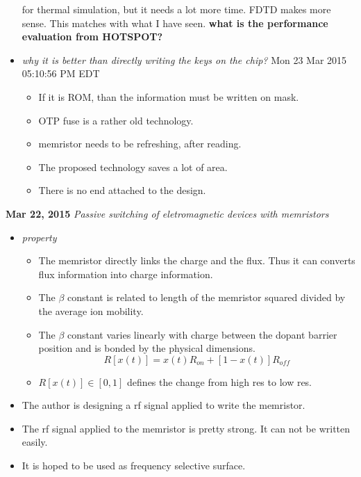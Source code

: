 \documentclass[]{article}
\newcommand{\todo}[1]{{\color{red}\textbf{#1}}}
\newcommand{\solved}[1]{{\color{blue}\textit{#1}}}
\begin{document}
\begin{itemize}
                for thermal simulation, but it needs a lot more time. FDTD makes
                more sense. This matches with what I have seen. \todo{what is
                the performance evaluation from HOTSPOT?}
                \item \solved{why it is better than directly writing the keys on
                the chip?} Mon 23 Mar 2015 05:10:56 PM EDT 
                \begin{itemize}
                    \item If it is ROM, than the information must be written on
                    mask.
                    \item OTP fuse is a rather old technology.
                    \item memristor needs to be refreshing, after reading.
                    \item The proposed technology saves a lot of area.
                    \item There is no end attached to the design.
                \end{itemize}

                
        \end{itemize}

\noindent \textbf{Mar 22, 2015}
\textit{Passive switching of eletromagnetic devices with memristors}
\indent		\begin{itemize}
        \item \textit{property} 
            \begin{itemize}
                \item The memristor directly links the charge and the flux. Thus it can
                converts flux information into charge information.             
                \item The $\beta$ constant is related to length of the memristor squared
                divided by the average ion mobility.
                \item The $\beta$ constant varies linearly with charge between the
                dopant barrier position and is bonded by the physical dimensions.
                \begin{equation}
                    R[x(t)] = x(t)R_{on}+[1-x(t)]R_{off}
                \end{equation}
                \item $R[x(t)]\in[0,1]$ defines the change from high res to low
                res.
            \end{itemize}
        \item The author is designing a rf signal applied to write the
        memristor.
        \item The rf signal applied to the memristor is pretty strong. It can
        not be written easily.
        \item It is hoped to be used as frequency selective surface.

        \end{itemize}
\end{document}
